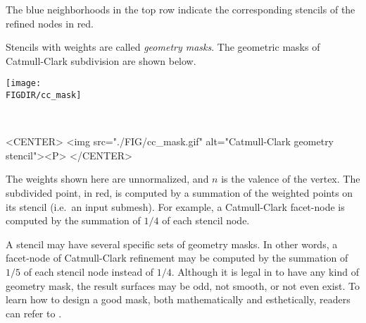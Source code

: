 The blue neighborhoods in the top row indicate the corresponding
stencils of the refined nodes in red. 

Stencils with weights are called \emph{geometry masks}.
The geometric masks of Catmull-Clark subdivision are shown below.

\begin{ccTexOnly}
  \begin{center}
    \parbox{0.4\textwidth}{%
      \texttt{[image: \\FIGDIR/cc\_mask]}%
    } \\ \vspace{0.5cm}
  \end{center}
\end{ccTexOnly}

\begin{ccHtmlOnly}
  <CENTER>
     <img src="./FIG/cc_mask.gif" alt="Catmull-Clark geometry stencil"><P>
  </CENTER>
\end{ccHtmlOnly}

The weights shown here are unnormalized, and $n$ is the valence 
of the vertex. The subdivided point, in red, is computed by a summation
of the weighted points on its stencil (i.e.~an input submesh).
For example, a Catmull-Clark facet-node is computed by the summation
of $1/4$ of each stencil node.

A stencil may have several specific sets of geometry masks. In other 
words, a facet-node of Catmull-Clark refinement may be computed by 
the summation of $1/5$ of each stencil node instead of $1/4$. 
Although it is legal in  to have 
any kind of geometry mask, the result surfaces may be odd, 
not smooth, or not even exist.
To learn how to design a good mask, both mathematically and esthetically, 
readers can refer to \cite{cgal:ww-smgd-02}.



